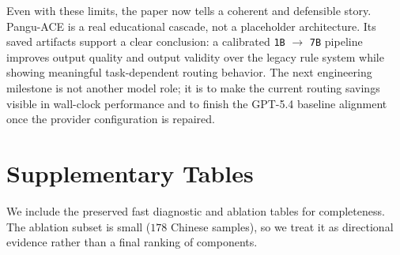 \documentclass{article}
\newcommand{\tighttable}[1]{%
  \begingroup
  \setlength{\tabcolsep}{5pt}%
  \renewcommand{\arraystretch}{1.12}%
  #1%
  \endgroup
}
\begin{document}
Even with these limits, the paper now tells a coherent and defensible story. Pangu-ACE is a real educational cascade, not a placeholder architecture. Its saved artifacts support a clear conclusion: a calibrated \texttt{1B} $\rightarrow$ \texttt{7B} pipeline improves output quality and output validity over the legacy rule system while showing meaningful task-dependent routing behavior. The next engineering milestone is not another model role; it is to make the current routing savings visible in wall-clock performance and to finish the GPT-5.4 baseline alignment once the provider configuration is repaired.

\appendix
\clearpage
\section{Supplementary Tables}
We include the preserved fast diagnostic and ablation tables for completeness. The ablation subset is small (\(178\) Chinese samples), so we treat it as directional evidence rather than a final ranking of components.

\begin{table}[H]
\centering
\caption{Chinese fast diagnostic subset.}
\small
\tighttable{}
\end{table}

\begin{table}[H]
\centering
\caption{English fast diagnostic subset.}
\small
\tighttable{}
\end{table}

\begin{table}[H]
\centering
\caption{Chinese ablation subset (\(178\) samples).}
\small
\tighttable{}
\end{table}

\begin{table}[H]
\centering
\caption{Post-archive live pilot on a matched \(76\)-sample Chinese test slice. These runs are diagnostic only, but they verify that the lighter variants mainly trade quality for efficiency rather than dominating \texttt{cascade\_final}.}
\label{tab:live_pilot_variants}
\small
\tighttable{}
\end{table}



\end{document}
